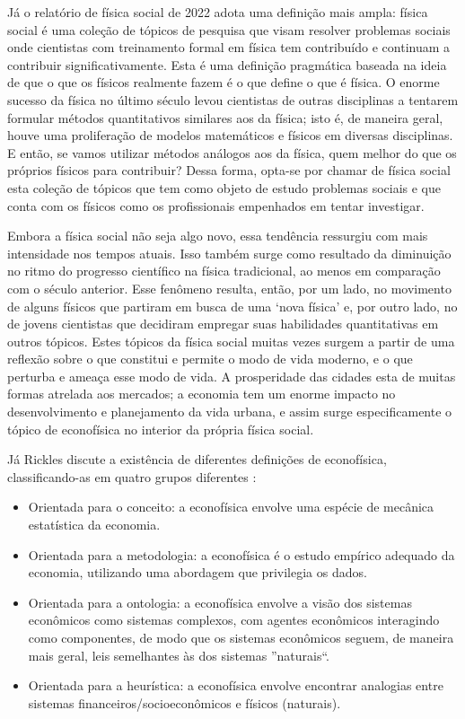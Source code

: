 Já o relatório de física social de 2022 adota uma definição mais ampla: física social é uma coleção de tópicos de pesquisa que visam resolver problemas sociais onde cientistas com treinamento formal em física tem contribuído e continuam a contribuir significativamente\cite{JUSUP20221}. Esta é uma definição pragmática baseada na ideia de que o que os físicos realmente fazem é o que define o que é física. O enorme sucesso da física no último século levou cientistas de outras disciplinas a tentarem formular métodos quantitativos similares aos da física; isto é, de maneira geral, houve uma proliferação de modelos matemáticos e físicos em diversas disciplinas. E então, se vamos utilizar métodos análogos aos da física, quem melhor do que os próprios físicos para contribuir? Dessa forma, opta-se por chamar de física social esta coleção de tópicos que tem como objeto de estudo problemas sociais e que conta com os físicos como os profissionais empenhados em tentar investigar.  

Embora a física social não seja algo novo, essa tendência ressurgiu com mais intensidade nos tempos atuais. Isso também surge como resultado da diminuição no ritmo do progresso científico na física tradicional, ao menos em comparação com o século anterior. Esse fenômeno resulta, então, por um lado, no movimento de alguns físicos que partiram em busca de uma `nova física' e, por outro lado, no de jovens cientistas que decidiram empregar suas habilidades quantitativas em outros tópicos. Estes tópicos da física social muitas vezes surgem a partir de uma reflexão sobre o que constitui e permite o modo de vida moderno, e o que perturba e ameaça esse modo de vida. A prosperidade das cidades esta de muitas formas atrelada aos mercados; a economia tem um enorme impacto no desenvolvimento e planejamento da vida urbana, e assim surge especificamente o tópico de econofísica no interior da própria física social.

Já Rickles discute a existência de diferentes definições de econofísica, classificando-as em quatro grupos diferentes \cite{rickles2023econophysics}:
\begin{itemize}
    \item Orientada para o conceito: a econofísica envolve uma espécie de mecânica estatística da economia.
    \item Orientada para a metodologia: a econofísica é o estudo empírico adequado da economia, utilizando uma abordagem que privilegia os dados.
    \item Orientada para a ontologia: a econofísica envolve a visão dos sistemas econômicos como sistemas complexos, com agentes econômicos interagindo como componentes, de modo que os sistemas econômicos seguem, de maneira mais geral, leis semelhantes às dos sistemas ''naturais``.
    \item Orientada para a heurística: a econofísica envolve encontrar analogias entre sistemas financeiros/socioeconômicos e físicos (naturais).
\end{itemize}

